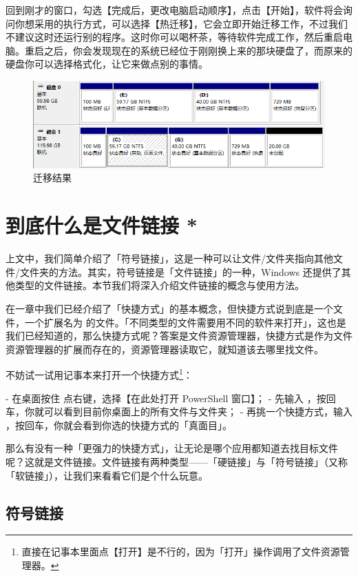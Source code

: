 {{{回到刚才的窗口，勾选【完成后，更改电脑启动顺序】，点击【开始】，软件将会询问你想采用的执行方式，可以选择【热迁移】，它会立即开始迁移工作，不过我们不建议这时还运行别的程序。这时你可以喝杯茶，等待软件完成工作，然后重启电脑。重启之后，你会发现现在的系统已经位于刚刚换上来的那块硬盘了，而原来的硬盘你可以选择格式化，让它来做点别的事情。

\begin{figure}[htb!]
  \centering
  \includegraphics[width=.75\textwidth]{assets/advanced/Migration_Result.png}
  \caption{迁移结果}
  \label{fig:Migration_Result}
\end{figure}

\section{到底什么是文件链接 *}

上文中，我们简单介绍了「符号链接」，这是一种可以让文件/文件夹指向其他文件/文件夹的方法。其实，符号链接是「文件链接」的一种，Windows 还提供了其他类型的文件链接。本节我们将深入介绍文件链接的概念与使用方法。

在一章中我们已经介绍了「快捷方式」的基本概念，但快捷方式说到底是一个文件，一个扩展名为  的文件。「不同类型的文件需要用不同的软件来打开」，这也是我们已经知道的，那么快捷方式呢？答案是文件资源管理器，快捷方式是作为文件资源管理器的扩展而存在的，资源管理器读取它，就知道该去哪里找文件。

不妨试一试用记事本来打开一个快捷方式\footnote{直接在记事本里面点【打开】是不行的，因为「打开」操作调用了文件资源管理器。}：

- 在桌面按住  点右键，选择【在此处打开 PowerShell 窗口】；
- 先输入 ，按回车，你就可以看到目前你桌面上的所有文件与文件夹；
- 再挑一个快捷方式，输入 ，按回车，你就会看到你选的快捷方式的「真面目」。

那么有没有一种「更强力的快捷方式」，让无论是哪个应用都知道去找目标文件呢？这就是文件链接。文件链接有两种类型——「硬链接」与「符号链接」（又称「软链接」），让我们来看看它们是个什么玩意。

\subsection{符号链接}

}}}
